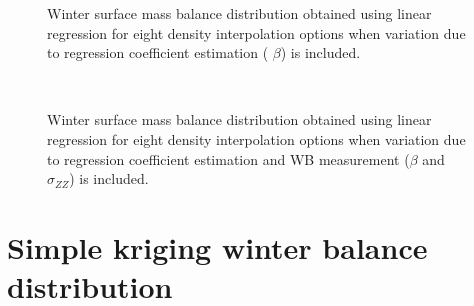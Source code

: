 \documentclass{sfuthesis}
\begin{document}
\begin{appendices}
\begin{figure}
	\caption[]{Winter surface mass balance distribution obtained using linear regression for eight density interpolation options when variation due to regression coefficient estimation ( $\beta$) is included. }
	\label{fig:WSMB_LR_Distributionbeta}
\end{figure}
\begin{figure}
	\centering
	\\
	\caption[]{Winter surface mass balance distribution obtained using linear regression for eight density interpolation options when variation due to regression coefficient estimation and WB measurement ($\beta$ and $\sigma_{ZZ}$) is included. }
	\label{fig:WSMB_LR_DistributionbetaNzz}
\end{figure}

\pagebreak
\section{Simple kriging winter balance distribution}


\end{appendices}
\end{document}
